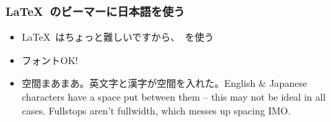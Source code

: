 \begin{frame}
\frametitle{\LaTeX\ のビーマーに日本語を使う}
\begin{itemize}
    \item \LaTeX\ はちょっと難しいですから、\XeLaTeX\ を使う
    \pause
    \item フォントOK!
    \pause
    \item 空間まあまあ。英文字と漢字が空間を入れた。English \& Japanese
          characters have a space put between them -- this may not be ideal in
          all cases. Fullstops aren't fullwidth, which messes up spacing IMO.
\end{itemize}
\end{frame}
